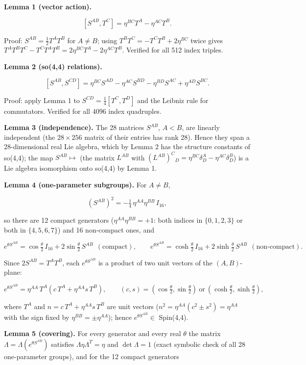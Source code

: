 \documentclass[10pt]{article}
\makeatletter
\newcommand\keepnext{\par\nopagebreak\@nobreaktrue\everypar{\@nobreakfalse\everypar{}}}
\makeatother
\begin{document}
\textbf{Lemma 1 (vector action).}\keepnext


\[
[S^{AB}, T^C] = \eta^{BC}T^A - \eta^{AC}T^B .
\]

Proof: $S^{AB} = \tfrac12T^AT^B$ for $A\neq B$; using $T^BT^C = -T^CT^B + 2\eta^{BC}$ twice gives $T^AT^BT^C - T^CT^AT^B = 2\eta^{BC}T^A - 2\eta^{AC}T^B$. Verified for all 512 index triples.


\textbf{Lemma 2 (so(4,4) relations).}\keepnext


\[
[S^{AB}, S^{CD}] = \eta^{BC}S^{AD} - \eta^{AC}S^{BD} - \eta^{BD}S^{AC} + \eta^{AD}S^{BC} .
\]

Proof: apply Lemma 1 to $S^{CD} = \tfrac14[T^C,T^D]$ and the Leibniz rule for commutators. Verified for all 4096 index quadruples.


\textbf{Lemma 3 (independence).} The 28 matrices $S^{AB}$, $A<B$, are linearly independent (the $28\times256$ matrix of their entries has rank 28). Hence they span a 28-dimensional real Lie algebra, which by Lemma 2 has the structure constants of so(4,4); the map $S^{AB}\mapsto$ (the matrix $L^{AB}$ with $(L^{AB})^C{}_D = \eta^{BC}\delta^A_D - \eta^{AC}\delta^B_D$) is a Lie algebra isomorphism onto so(4,4) by Lemma 1.


\textbf{Lemma 4 (one-parameter subgroups).} For $A\neq B$,\keepnext


\[
(S^{AB})^2 = -\tfrac14\,\eta^{AA}\eta^{BB}\, I_{16},
\]

so there are 12 compact generators ($\eta^{AA}\eta^{BB}=+1$: both indices in $\{0,1,2,3\}$ or both in $\{4,5,6,7\}$) and 16 non-compact ones, and\keepnext


\[
e^{\theta S^{AB}} = \cos\tfrac\theta2\, I_{16} + 2\sin\tfrac\theta2\, S^{AB}\ \ (\text{compact}), \qquad e^{\theta S^{AB}} = \cosh\tfrac\theta2\, I_{16} + 2\sinh\tfrac\theta2\, S^{AB}\ \ (\text{non-compact}).
\]

Since $2S^{AB} = T^AT^B$, each $e^{\theta S^{AB}}$ is a product of two unit vectors of the $(A,B)$-plane:\keepnext


\[
e^{\theta S^{AB}} = \eta^{AA}\,T^A\left(c\,T^A + \eta^{AA} s\,T^B\right), \qquad (c,s) = (\cos\tfrac\theta2, \sin\tfrac\theta2)\ \text{or}\ (\cosh\tfrac\theta2, \sinh\tfrac\theta2),
\]

where $T^A$ and $n = c\,T^A + \eta^{AA}s\,T^B$ are unit vectors ($n^2 = \eta^{AA}(c^2 \pm s^2) = \eta^{AA}$ with the sign fixed by $\eta^{BB} = \pm\eta^{AA}$); hence $e^{\theta S^{AB}}\in$ Spin(4,4).


\textbf{Lemma 5 (covering).} For every generator and every real $\theta$ the matrix $\Lambda = \Lambda(e^{\theta S^{AB}})$ satisfies $\Lambda\eta\Lambda^T = \eta$ and $\det\Lambda = 1$ (exact symbolic check of all 28 one-parameter groups), and for the 12 compact generators\keepnext
\end{document}
